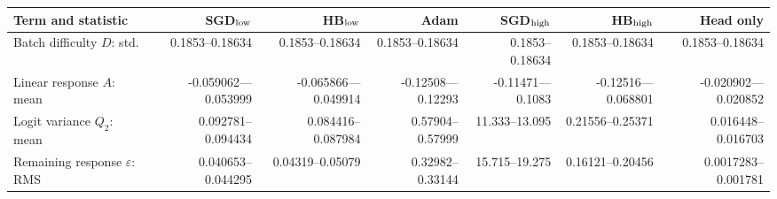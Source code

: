 \begin{tabular}{lrrrrrr}
\hline
Term and statistic & SGD$_{\rm low}$ & HB$_{\rm low}$ & Adam & SGD$_{\rm high}$ & HB$_{\rm high}$ & Head only \\
\hline
Batch difficulty $D$: std. & 0.1853--0.18634 & 0.1853--0.18634 & 0.1853--0.18634 & 0.1853--0.18634 & 0.1853--0.18634 & 0.1853--0.18634 \\
Linear response $A$: mean & -0.059062---0.053999 & -0.065866---0.049914 & -0.12508---0.12293 & -0.11471---0.1083 & -0.12516---0.068801 & -0.020902---0.020852 \\
Logit variance $Q_2$: mean & 0.092781--0.094434 & 0.084416--0.087984 & 0.57904--0.57999 & 11.333--13.095 & 0.21556--0.25371 & 0.016448--0.016703 \\
Remaining response $\varepsilon$: RMS & 0.040653--0.044295 & 0.04319--0.05079 & 0.32982--0.33144 & 15.715--19.275 & 0.16121--0.20456 & 0.0017283--0.001781 \\
\hline
\end{tabular}

